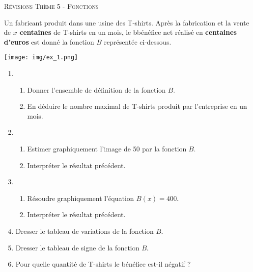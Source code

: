 \documentclass[a4paper]{article}
\begin{document}
    
  \pagebreak



  \begin{center}
      {\scshape\LARGE Révisions Thème 5 - Fonctions\par}
      \vspace{0.5cm}
    \end{center}
  
    \setcounter{exercice}{0}

    \begin{exercice}{}{}
      Un fabricant produit dans une usine des T-shirts.
    Après la fabrication et la vente de {\bf $x$ centaines} de T-shirts en un mois, le bbénéfice net réalisé en {\bf centaines d'euros} est donné la fonction $B$ représentée ci-dessous.

  \begin{center}
    \noindent \texttt{[image: img/ex\_1.png]}
  \end{center}

  \begin{enumerate}
    \item \begin{enumerate}
      \item Donner l'ensemble de définition de la fonction $B$.
      \item En déduire le nombre maximal de T-shirts produit par l'entreprise en un mois.
    \end{enumerate}
    \item \begin{enumerate}
      \item Estimer graphiquement l'image de 50 par la fonction $B$.
      \item Interpréter le résultat précédent.
    \end{enumerate}
    \item \begin{enumerate}
      \item Résoudre graphiquement l'équation $B(x) = 400$.
      \item Interpréter le résultat précédent.
    \end{enumerate}
    \item Dresser le tableau de variations de la fonction $B$.
    \item Dresser le tableau de signe de la fonction $B$.
    \item Pour quelle quantité de T-shirts le bénéfice est-il négatif ?
  \end{enumerate}
    \end{exercice}
\end{document}

